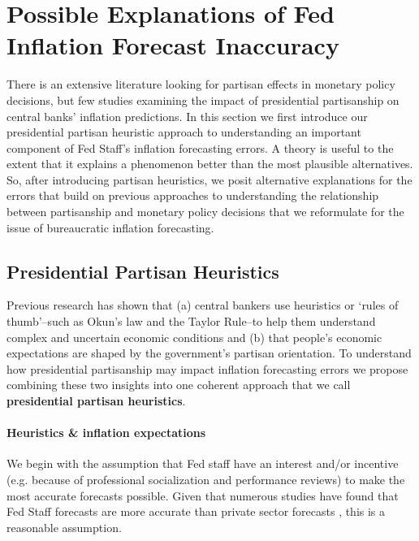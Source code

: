 \documentclass[a4paper]{article}
\begin{document}
\section{Possible Explanations of Fed Inflation Forecast Inaccuracy}

There is an extensive literature looking for partisan effects in monetary policy decisions, but few studies examining the impact of presidential partisanship on central banks' inflation predictions. In this section we first introduce our presidential partisan heuristic approach to understanding an important component of Fed Staff's inflation forecasting errors. A theory is useful to the extent that it explains a phenomenon better than the most plausible alternatives. So, after introducing partisan heuristics, we posit alternative explanations for the errors that build on previous approaches to understanding the relationship between partisanship and monetary policy decisions that we reformulate for the issue of bureaucratic inflation forecasting.

\subsection{Presidential Partisan Heuristics}

Previous research has shown that (a) central bankers use heuristics or `rules of thumb'--such as Okun's law and the Taylor Rule--to help them understand complex and uncertain economic conditions and (b) that people's economic expectations are shaped by the government's partisan orientation. To understand how presidential partisanship may impact inflation forecasting errors we propose combining these two insights into one coherent approach that we call {\bf{presidential partisan heuristics}}. 

\paragraph{Heuristics \& inflation expectations}

We begin with the assumption that Fed staff have an interest and/or incentive (e.g. because of professional socialization and performance reviews) to make the most accurate forecasts possible. Given that numerous studies have found that Fed Staff forecasts are more accurate than private sector forecasts \cite[see][]{Romer2000,Gamber2009}, this is a reasonable assumption.  
\end{document}
